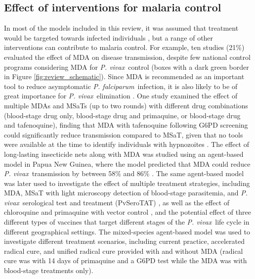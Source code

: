\documentclass[12pt]{article}
\newcommand{\pv}{\textit{P. vivax}}
\newcommand{\pf}{\textit{P. falciparum}}
\begin{document}
\subsection{Effect of interventions for malaria control}


In most of the models included in this review, it was assumed that treatment would be targeted towards infected individuals \cite{fujita2006modeling,chamchod2013modeling,roy2013potential,huo2014stability,white2014modelling,pizzitutti2015validated,gebremichaelrelapse,silal2019malaria,kim2012genotyping,nekkab2021estimated,huber2021radical,tasman2022assessing,olaniyi2023optimal}, but a range of other interventions can contribute to malaria control. For example, ten studies (21\%) evaluated the effect of MDA on disease transmission, despite few national control programs considering MDA for \pv~control \cite{ishikawa2000prevalence,ishikawa2003mathematical,aguas2012modeling,robinson2015strategies,white2018mathematical,mehra2022hypnozoite,obadia2022developing,anwar2023optimal,walker2023model,nekkab2023accelerating} (boxes with a dark green border in Figure \ref{fig:review_schematic}). Since MDA is recommended as an important tool to reduce asymptomatic \pf~infection, it is also likely to be of great importance for \pv~elimination \cite{robinson2015strategies,grueninger2013transitioning,okell2011potential}. One study examined the effect of multiple MDAs and MSaTs (up to two rounds) with different drug combinations (blood-stage drug only, blood-stage drug and primaquine, or blood-stage drug and tafenoquine), finding that MDA with tafenoquine following G6PD screening could significantly reduce transmission compared to MSaT, given that no tools were available at the time to identify individuals with hypnozoites \cite{robinson2015strategies}. The effect of long-lasting insecticide nets along with MDA was studied using an agent-based model in Papua New Guinea, where the model predicted that MDA could reduce \pv~transmission by between 58\% and 86\% \cite{white2018mathematical}. The same agent-based model was later used to investigate the effect of multiple treatment strategies, including MDA, MSaT with light microscopy detection of blood-stage parasitemia, and \pv~serological test and treatment (PvSeroTAT) \cite{obadia2022developing,nekkab2023accelerating}, as well as the effect of chloroquine and primaquine with vector control \cite{nekkab2021estimated}, and the potential effect of three different types of vaccines that target different stages of the \pv~life cycle \cite{white2022potential} in different geographical settings. The mixed-species agent-based model \cite{walker2023model} was used to investigate different treatment scenarios, including current practice, accelerated radical cure, and unified radical cure provided with and without MDA (radical cure was with 14 days of primaquine and a G6PD test while the MDA was with blood-stage treatments only). 
\end{document}
